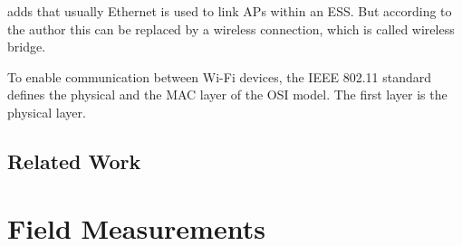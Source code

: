 \documentclass[]{nsm-thesis}
\begin{document}
\textcite{sauter_wireless_2022} adds that usually Ethernet is used to link \ac{AP}s within an \ac{ESS}.
But according to the author this can be replaced by a wireless connection, which is called wireless bridge.

To enable communication between Wi-Fi devices, the IEEE 802.11 standard defines the physical and the MAC layer of the OSI model. The first layer is the physical layer.









%

\begin{comment}
	\section{Modell für drahtlose Übertragungssysteme}
Abb 2.3.1  Modell einen Übertragungssystems
Beschränkungen und Regelungen Frequenzwahl, Sendeleistung
Analoger Kanal Störungen: thermisches Rauschen, Nebensprechen, Impulsstörungen
\fi

\end{comment}

\section{Related Work}





\chapter{Field Measurements}

\begin{comment}
	Netcat not working no interval but connection setup easy. maybe something else

iperf run unlimited?


\end{comment}





\begin{comment}
Describe Mistakes?

\end{comment}
\end{document}
